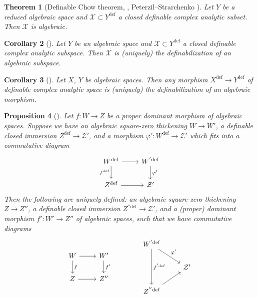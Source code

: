 \documentclass{amsart}
\newtheorem{theorem}{Theorem}[section]
\newtheorem{proposition}[theorem]{Proposition}
\newtheorem{corollary}[theorem]{Corollary}
\theoremstyle{definition}
\numberwithin{equation}{section}
\newcommand{\definable}{\mathrm{def}}
\begin{document}
\begin{theorem}[{Definable Chow theorem, \cite[Theorem 2.23]{zbMATH07662555}, Peterzil--Strarchenko \cite[Theorem 2.14]{zbMATH05364146}}]
    Let $Y$ be a reduced algebraic space and 
    $\mathcal{X} \subset Y^{\definable}$ a closed definable complex analytic subset.
    Then $\mathcal{X}$ is algebraic.
\end{theorem}

\begin{corollary}[{\cite[Corollary 3.10]{zbMATH07662555}}]
    Let $Y$ be an algebraic space and $\mathcal{X} \subset Y^{\definable}$ a closed definable complex analytic subspace.
    Then $\mathcal{X}$ is (uniquely) the definabilization of an algebraic subspace.
\end{corollary}

\begin{corollary}[{\cite[Corollary 3.11]{zbMATH07662555}}]
    Let $X$, $Y$ be algebraic spaces.
    Then any morphism $X^{\definable} \to Y^{\definable}$ of definable complex analytic space is (uniquely) the definabilization of an algebraic morphism.
\end{corollary}

\begin{proposition}[{\cite[Proposition 4.5]{zbMATH07662555}}]
    Let $f: W \to Z$ be a proper dominant morphism of algebraic spaces.
    Suppose we have an algebraic square-zero thickening
    $W \to W'$, a definable closed immersion $Z^{\definable} \to \mathcal{Z}'$,
    and a morphism $\varphi': W^{\definable}\to \mathcal{Z}'$ which fits into a commutative diagram
    \[\begin{tikzcd}
        W^{\definable} \ar[r]\ar[d,"f^{\definable}"'] & W^{'\definable}\ar[d,"\varphi'"] \\
        Z^{\definable} \ar[r] & \mathcal{Z}'
    \end{tikzcd}\]
    Then the following are uniquely defined:
    an algebraic square-zero thickening
    $Z \to Z''$,
    a definable closed immersion $Z^{''\definable} \to \mathcal{Z}'$,
    and a (proper) dominant morphism $f': W' \to Z''$ of algebraic spaces,
    such that we have commutative diagrams
    \[
    \begin{tikzcd}
        W\ar[r]\ar[d,"f"] & W'\ar[d,"f'"] \\
        Z \ar[r] & Z''
    \end{tikzcd}
    \hspace{40pt}
    \begin{tikzcd}
        W^{'\definable}\ar[dd,"f^{'\definable}"]\ar[rd,"\varphi'"] & \\
        & \mathcal{Z}' \\
        Z^{''\definable}\ar[ur] &
    \end{tikzcd}
    \]
\end{proposition}
\end{document}
